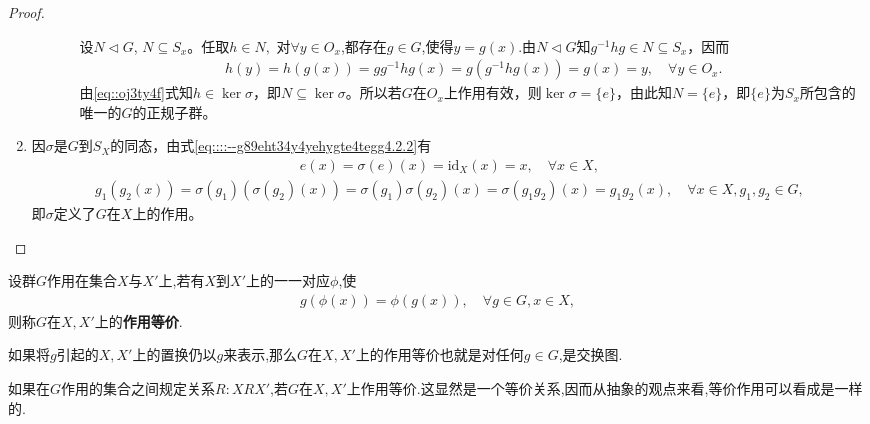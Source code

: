 \documentclass[../../main.tex]{subfiles}%
\begin{document}
\begin{proof}
\begin{enumerate}
\begin{enumerate}[(1)]
\begin{enumerate}[(i)]
设$N \lhd G$, $N \subseteq S_x$。任取$ h \in N,$ 对$\forall y\in O_x$,都存在$g \in G$,使得$y=g(x)$.由$N\lhd G$知$g^{-1}hg \in N \subseteq S_x$，因而
\begin{align*}
h(y)=h(g(x))=gg^{-1}hg\left( x \right) =g(g^{-1}hg(x))=g(x)=y,\quad \forall y\in O_x.
\end{align*}
由\eqref{eq::oj3ty4f}式知$h \in \ker\sigma$，即$N \subseteq \ker\sigma$。所以若$G$在$O_x$上作用有效，则$\ker\sigma = \{e\}$，由此知$N = \{e\}$，即$\{e\}$为$S_x$所包含的唯一的$G$的正规子群。
\end{enumerate}
\end{enumerate}

\item 因$\sigma$是$G$到$S_X$的同态，由式\eqref{eq::::--g89eht34y4yehygte4tegg4.2.2}有
\begin{align*}
e(x) = \sigma(e)(x) = \text{id}_X(x) = x, \quad \forall x \in X,
\end{align*}
\begin{align*}
g_1(g_2(x)) = \sigma(g_1)(\sigma(g_2)(x)) = \sigma(g_1)\sigma(g_2)(x) = \sigma(g_1g_2)(x) = g_1g_2(x), \quad \forall x \in X, g_1, g_2 \in G,
\end{align*}
即$\sigma$定义了$G$在$X$上的作用。
\end{enumerate}

\end{proof}

\begin{definition}
设群$G$作用在集合$X$与$X'$上,若有$X$到$X'$上的一一对应$\phi$,使
\begin{align*}
g(\phi(x)) = \phi(g(x)), \quad \forall g \in G, x \in X,
\end{align*}
则称$G$在$X, X'$上的\textbf{作用等价}.
\end{definition}
\begin{remark}
如果将$g$引起的$X, X'$上的置换仍以$g$来表示,那么$G$在$X, X'$上的作用等价也就是对任何$g \in G$,是交换图.

如果在$G$作用的集合之间规定关系$R: XRX'$,若$G$在$X, X'$上作用等价.这显然是一个等价关系,因而从抽象的观点来看,等价作用可以看成是一样的.
\begin{figure}[H]
\centering
\caption{}
\label{figure:交换图--xxx-1.1.1.1}
\end{figure}
\end{remark}
\end{document}
